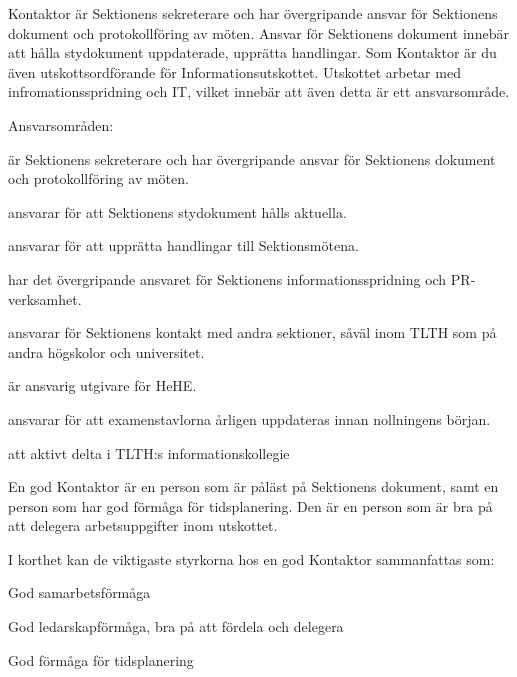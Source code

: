 \documentclass[10pt]{article}
\def\post{Kontaktor}
\def\doctitle{Kravprofil för \post}
\begin{document}
    \heading{\doctitle}
    
    
    Kontaktor är Sektionens sekreterare och har övergripande ansvar för Sektionens dokument och
    protokollföring av möten. Ansvar för Sektionens dokument innebär att hålla stydokument
    uppdaterade, upprätta handlingar. Som Kontaktor är du även utskottsordförande för
    Informationsutskottet. Utskottet arbetar med infromationsspridning och IT, vilket
    innebär att även detta är ett ansvarsområde.
    
    Ansvarsområden:
    \begin{dashlist}
        \item är Sektionens sekreterare och har övergripande ansvar för Sektionens dokument och
        protokollföring av möten.
        \item ansvarar för att Sektionens stydokument hålls aktuella.
        \item ansvarar för att upprätta handlingar till Sektionsmötena.
        \item har det övergripande ansvaret för Sektionens informationsspridning och PR-verksamhet.
        \item ansvarar för Sektionens kontakt med andra sektioner, såväl inom TLTH som på andra
        högskolor och universitet.
        \item är ansvarig utgivare för HeHE.
        \item ansvarar för att examenstavlorna årligen uppdateras innan nollningens början.
        \item att aktivt delta i TLTH:s informationskollegie
    \end{dashlist}
    
    En god Kontaktor är en person som är påläst på Sektionens dokument, samt en person som
    har god förmåga för tidsplanering. Den är en person som är bra på att delegera
    arbetsuppgifter inom utskottet. 
    
    I korthet kan de viktigaste styrkorna hos en god {\post} sammanfattas som:
    \begin{dashlist}
        \item God samarbetsförmåga
        \item God ledarskapförmåga, bra på att fördela och delegera
        \item God förmåga för tidsplanering
    \end{dashlist}
    
\end{document}

